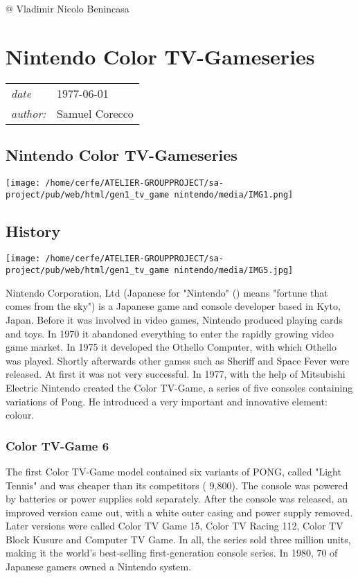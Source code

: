 \documentclass[a4paper,10pt]{book}
\newcommand{\pageHeader}[4]{
    \section{#1}
    \vspace{-0.3cm}
    \begin{table}[h!]
     \begin{tabular}{ll}
        \hline
        \textit{date} & #2 \\
        \textit{author: } & #3\\
        \hline
     \end{tabular}
    \end{table}
    \vspace{-0.3cm}
}
\begin{document}
 
 @ Vladimir Nicolo Benincasa 
 
 \newpage\pageHeader{Nintendo Color TV-Gameseries}{1977-06-01}{Samuel Corecco}{A page about the Nintendo Color TV-Gameseries}
 \subsection{Nintendo Color TV-Gameseries }
     
 \texttt{[image: /home/cerfe/ATELIER-GROUPPROJECT/sa-project/pub/web/html/gen1\_tv\_game nintendo/media/IMG1.png]}
 
 
 \subsection{History }
 
 
 \texttt{[image: /home/cerfe/ATELIER-GROUPPROJECT/sa-project/pub/web/html/gen1\_tv\_game nintendo/media/IMG5.jpg]}
 
          Nintendo Corporation, Ltd (Japanese for "Nintendo" () means "fortune that comes from the sky") is a Japanese game and console developer based in Kyto, Japan.
Before it was involved in video games, Nintendo produced playing cards and toys. In 1970 it abandoned everything to enter the rapidly growing video game market. In 1975 it developed the Othello Computer, with which Othello was played. Shortly afterwards other games such as Sheriff and Space Fever were released. At first it was not very successful.
In 1977, with the help of Mitsubishi Electric Nintendo created the Color TV-Game, a series of five consoles containing variations of Pong. He introduced a very important and innovative element: colour.  
 
 \subsubsection{Color TV-Game 6 }
 The first Color TV-Game model contained six variants of PONG, called "Light Tennis" and was cheaper than its competitors ( 9,800). The console was powered by batteries or power supplies sold separately. After the console was released, an improved version came out, with a white outer casing and power supply removed.
Later versions were called Color TV Game 15, Color TV Racing 112, Color TV Block Kusure and Computer TV Game. In all, the series sold three million units, making it the world's best-selling first-generation console series. In 1980, 70 of Japanese gamers owned a Nintendo system.
 
\end{document}
